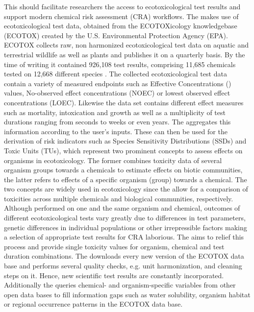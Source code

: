 This should facilitate researchers the access to ecotoxicological test results and support modern chemical risk assessment (CRA) workflows. The \etoxbase{} makes use of ecotoxicological test data, obtained from the ECOTOXicology knowledgebase (ECOTOX) created by the U.S. Environmental Protection Agency (EPA). ECOTOX collects raw, non harmonized ecotoxicological test data on aquatic and terrestrial wildlife as well as plants and publishes it on a quarterly basis. By the time of writing it contained 926,108 test results, comprising 11,685 chemicals tested on 12,668 different species \citep{elonen_ecotoxicology_2018}. The collected ecotoxicological test data contain a variety of measured endpoints such as Effective Concentrations (\ecfifty{}) values, No-observed effect concentrations (NOEC) or lowest observed effect concentrations (LOEC). Likewise the data set contains different effect measures such as mortality, intoxication and growth as well as a multiplicity of test durations ranging from seconds to weeks or even years. The \etoxbase{} aggregates this information according to the user's inputs. These can then be used for the derivation of risk indicators such as Species Sensitivity Distributions (SSDs) \citep{posthuma_species_2002} and Toxic Units (TUs), which represent two prominent concepts to assess effects on organisms in ecotoxicology. The former combines toxicity data of several organism groups towards a chemicals to estimate effects on biotic communities, the latter refers to effects of a specific organism (group) towards a chemical. The two concepts are widely used in ecotoxicology \citep{kefford_definition_2011, schafer_effects_2011} since the allow for a comparison of toxicities across multiple chemicals and biological communities, respectively. Although performed on one and the same organism and chemical, outcomes of different ecotoxicological tests vary greatly due to differences in test parameters, genetic differences in individual populations or other irrepressible factors making a selection of appropriate test results for CRA laborious. The \etoxbase{} aims to relief this process and provide single toxicity values for organism, chemical and test duration combinations. The \etoxbase{} downloads every new version of the ECOTOX data base and performs several quality checks, e.g. unit harmonization, and cleaning steps on it. Hence, new scientific test results are constantly incorporated. Additionally the \etoxbase{} queries chemical- and organism-specific variables from other open data bases to fill information gaps such as water solubility, organism habitat or regional occurrence patterns in the ECOTOX data base.



